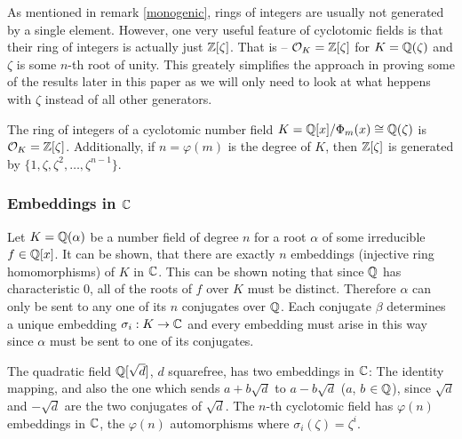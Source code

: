 As mentioned in remark \ref{monogenic}, rings of integers are usually not generated by a single element. However, one very useful feature of cyclotomic fields is that their ring of integers is actually just $\mathbb{Z}[\zeta]$. That is -- $\mathcal{O}_K = \mathbb{Z}[\zeta]$ for $K = \mathbb{Q}(\zeta)$ and $\zeta$ is some $n$-th root of unity. This greately simplifies the approach in proving some of the results later in this paper as we will only need to look at what heppens with $\zeta$ instead of all other generators.

\begin{proposition}\label{cycl-ok}
	The ring of integers of a cyclotomic number field $K = \mathbb{Q}[x]/\Phi_m(x) \cong \mathbb{Q}(\zeta)$ is $\mathcal{O}_K = \mathbb{Z}[\zeta]$. Additionally, if $n = \varphi(m)$ is the degree of $K$, then $\mathbb{Z}[\zeta]$ is generated by $\{1, \zeta, \zeta^2, \dots, \zeta^{n-1} \}$.
\end{proposition}

\subsubsection*{Embeddings in $\mathbb{C}$}
Let $K = \mathbb{Q}(\alpha)$ be a number field of degree $n$ for a root $\alpha$ of some irreducible $f \in \mathbb{Q}[x]$. It can be shown, that there are exactly $n$ embeddings (injective ring homomorphisms) of $K$ in $\mathbb{C}$. This can be shown noting that since $\mathbb{Q}$ has characteristic 0, all of the roots of $f$ over $K$ must be distinct. Therefore $\alpha$ can only be sent to any one of its $n$ conjugates over $\mathbb{Q}$. Each conjugate $\beta$ determines a unique embedding $\sigma_i: K \rightarrow \mathbb{C}$ and every embedding must arise in this way since $\alpha$ must be sent to one of its conjugates.

\begin{example}
    The quadratic field $\mathbb{Q}[\sqrt{d}]$, $d$ squarefree, has two embeddings in $\mathbb{C}$: The identity mapping, and also the one which sends $a + b\sqrt{d}$ to $a - b\sqrt{d}$ ($a$, $b$ $\in \mathbb{Q}$), since $\sqrt{d}$ and $-\sqrt{d}$ are the two conjugates of $\sqrt{d}$. The $n$-th cyclotomic field has $\varphi(n)$ embeddings in $\mathbb{C}$, the $\varphi(n)$ automorphisms where $\sigma_i(\zeta) = \zeta^i$.
\end{example}

 
\begin{definition}

\end{definition}

